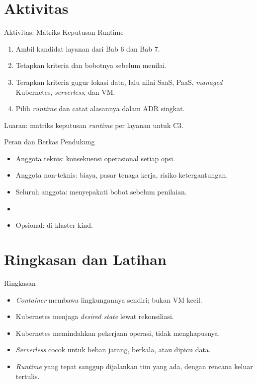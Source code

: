 \documentclass[aspectratio=169, table, 12pt]{beamer}
\begin{document}
\section{Aktivitas}

\begin{frame}{{\Large Aktivitas: Matriks Keputusan Runtime}}
  \vspace{6pt}
  \begin{enumerate}
    \item Ambil kandidat layanan dari Bab 6 dan Bab 7.
    \item Tetapkan kriteria dan bobotnya sebelum menilai.
    \item Terapkan kriteria gugur lokasi data, lalu nilai SaaS, PaaS,
          \textit{managed} Kubernetes, \textit{serverless}, dan VM.
    \item Pilih \textit{runtime} dan catat alasannya dalam ADR singkat.
  \end{enumerate}
  \vspace{4pt}
  {\small Luaran: matriks keputusan \textit{runtime} per layanan untuk C3.}
\end{frame}

\begin{frame}{{\Large Peran dan Berkas Pendukung}}
  \vspace{6pt}
  \begin{itemize}
    \item Anggota teknis: konsekuensi operasional setiap opsi.
    \item Anggota non-teknis: biaya, pasar tenaga kerja, risiko
          ketergantungan.
    \item Seluruh anggota: menyepakati bobot sebelum penilaian.
    \item {}
    \item Opsional:  di klaster
          kind.
  \end{itemize}
\end{frame}

\section{Ringkasan dan Latihan}

\begin{frame}{{\Large Ringkasan}}
  \vspace{6pt}
  \begin{itemize}
    \item \textit{Container} membawa lingkungannya sendiri; bukan VM kecil.
    \item Kubernetes menjaga \textit{desired state} lewat rekonsiliasi.
    \item Kubernetes memindahkan pekerjaan operasi, tidak menghapusnya.
    \item \textit{Serverless} cocok untuk beban jarang, berkala, atau dipicu
          data.
    \item \textit{Runtime} yang tepat sanggup dijalankan tim yang ada, dengan
          rencana keluar tertulis.
  \end{itemize}
\end{frame}
\end{document}
